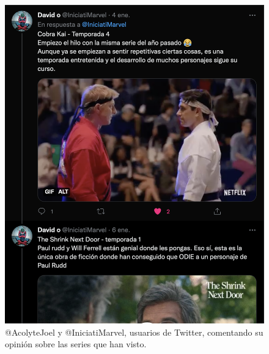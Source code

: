 \begin{figure}[]
    \includegraphics[scale=0.253]{img/twitter-thread-2.png}
	\caption{ @AcolyteJoel y @IniciatiMarvel, usuarios de Twitter, comentando su opinión sobre las series que han visto. }
    \label{fig:twitter_threads}
\end{figure}
